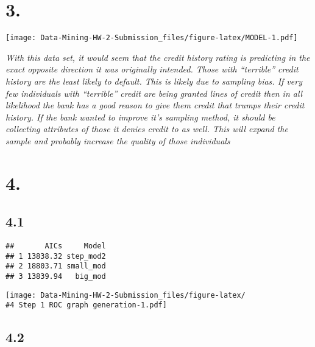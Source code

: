 \documentclass[
]{article}
\begin{document}
\hypertarget{section-2}{%
\section{3.}\label{section-2}}

\texttt{[image: Data-Mining-HW-2-Submission\_files/figure-latex/MODEL-1.pdf]}

\emph{With this data set, it would seem that the credit history rating
is predicting in the exact opposite direction it was originally
intended. Those with ``terrible'' credit history are the least likely to
default. This is likely due to sampling bias. If very few individuals
with ``terrible'' credit are being granted lines of credit then in all
likelihood the bank has a good reason to give them credit that trumps
their credit history. If the bank wanted to improve it's sampling
method, it should be collecting attributes of those it denies credit to
as well. This will expand the sample and probably increase the quality
of those individuals }

\hypertarget{section-3}{%
\section{4.}\label{section-3}}

\hypertarget{section-4}{%
\subsection{4.1}\label{section-4}}

\begin{verbatim}
##       AICs     Model
## 1 13838.32 step_mod2
## 2 18803.71 small_mod
## 3 13839.94   big_mod
\end{verbatim}

\texttt{[image: Data-Mining-HW-2-Submission\_files/figure-latex/\\\#4 Step 1 ROC graph generation-1.pdf]}

\hypertarget{section-5}{%
\subsection{4.2}\label{section-5}}
\end{document}
